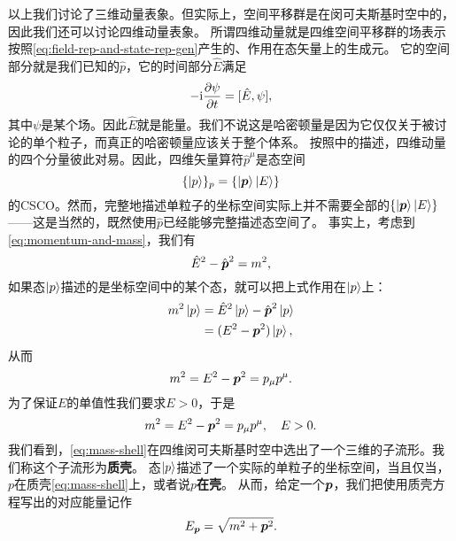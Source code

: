 \documentclass[hyperref, UTF8, a4paper]{ctexart}
\newcommand*{\ii}{\mathrm{i}}
\renewcommand{\autoref}{\prettyref}
\begin{document}
以上我们讨论了三维动量表象。但实际上，空间平移群是在闵可夫斯基时空中的，因此我们还可以讨论四维动量表象。
所谓四维动量就是四维空间平移群的场表示按照\eqref{eq:field-rep-and-state-rep-gen}产生的、作用在态矢量上的生成元。
它的空间部分就是我们已知的$\hat{p}$，它的时间部分$\hat{E}$满足
\[
    - \ii \pdv{\psi}{t} = [\hat{E}, \psi],
\]
其中$\psi$是某个场。因此$\hat{E}$就是能量。我们不说这是哈密顿量是因为它仅仅关于被讨论的单个粒子，而真正的哈密顿量应该关于整个体系。
按照\autoref{sec:translation}中的描述，四维动量的四个分量彼此对易。因此，四维矢量算符$\hat{p}^\mu$是态空间
\[
    \{\ket{p}\}_p = \{\ket{\vb*{p}} \ket{E}\}
\]
的CSCO。然而，完整地描述单粒子的坐标空间实际上并不需要全部的$\{\ket{\vb*{p}} \ket{E}\}$——这是当然的，既然使用$\hat{p}$已经能够完整描述态空间了。
事实上，考虑到\eqref{eq:momentum-and-mass}，我们有
\begin{equation}
    \hat{E}^2 - \hat{\vb*{p}}^2 = m^2,
\end{equation}
如果态$\ket{p}$描述的是坐标空间中的某个态，就可以把上式作用在$\ket{p}$上：
\[
    \begin{aligned}
        m^2 \ket{p} &= \hat{E}^2 \ket{p} - \hat{\vb*{p}}^2 \ket{p} \\
        &= (E^2 - \vb*{p}^2) \ket{p},
    \end{aligned}
\]
从而
\[
    m^2 = E^2 - \vb*{p}^2 = p_\mu p^\mu.
\]
为了保证$E$的单值性我们要求$E>0$，于是
\begin{equation}
    m^2 = E^2 - \vb*{p}^2 = p_\mu p^\mu, \quad E > 0.
    \label{eq:mass-shell}
\end{equation}
我们看到，\eqref{eq:mass-shell}在四维闵可夫斯基时空中选出了一个三维的子流形。我们称这个子流形为\textbf{质壳}。
态$\ket{p}$描述了一个实际的单粒子的坐标空间，当且仅当，$p$在质壳\eqref{eq:mass-shell}上，或者说$p$\textbf{在壳}。
从而，给定一个$\vb*{p}$，我们把使用质壳方程写出的对应能量记作
\begin{equation}
    E_{\vb*{p}} = \sqrt{ m^2 + \vb*{p}^2 }.
\end{equation}
\end{document}
